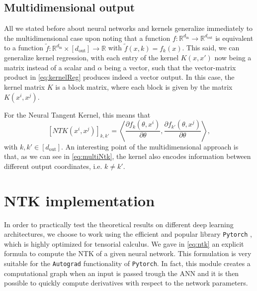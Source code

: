 \documentclass[11pt,notitlepage]{article}
\numberwithin{equation}{section}
\def\R{{\mathbb{R}}}
\theoremstyle{remark}
\theoremstyle{definition}
\begin{document}
	\subsection{Multidimensional output}
	
	All we stated before about neural networks and kernels generalize immediately to the multi\-dimensional case upon noting that a function $f : \R^{d_\text{in}} \rightarrow \R^{d_\text{out}}$ is equivalent to a function $\tilde{f} : \R^{d_\text{in}} \times [d_\text{out}] \rightarrow \R$ with $\tilde{f}(x, k) = f_k(x)$.
	This said, we can generalize kernel regression, with each entry of the kernel $K(x, x')$ now being a matrix instead of a scalar and $\alpha$ being a vector, such that the vector-matrix product in \eqref{eq:kernelReg} produces indeed a vector output.
	In this case, the kernel matrix $K$ is a block matrix, where each block is given by the matrix $K(x^i, x^j)$.
	
	For the Neural Tangent Kernel, this means that 
	\begin{equation}\label{eq:multiNtk}
	[NTK(x^i,x^j)]_{k, k'} = \left\langle \frac{\partial f_k (\theta, x^i)}{\partial \theta}, \frac{\partial f_{k'} (\theta, x^j)}{\partial \theta} \right\rangle,
	\end{equation}
	with $k,k' \in [d_\text{out}]$.
	An interesting point of the multidimensional approach is that, as we can see in \eqref{eq:multiNtk}, the kernel also encodes information between different output coordinates, i.e. $k \neq k'$.
	
	
	\section{NTK implementation}\label{sec:implementation}
	
	In order to practically test the theoretical results on different deep learning architectures, we choose to work using the efficient and popular library \verb|Pytorch| \cite{pytorch}, which is highly optimized for tensorial calculus.
	We gave in \eqref{eq:ntk} an explicit formula to compute the NTK of a given neural network.
	This formulation is very suitable for the \verb|Autograd| functionality of \verb|Pytorch|.
	In fact, this module creates a computational graph when an input is passed trough the ANN and it is then possible to quickly compute derivatives with respect to the network parameters.
	
\end{document}
